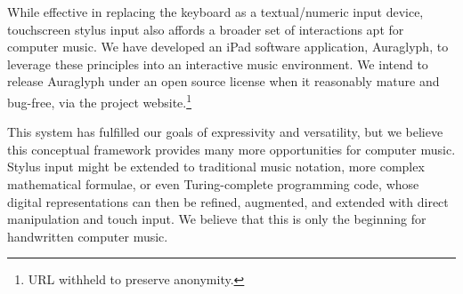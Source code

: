 \documentclass{nime-alternate}
\begin{document}
While effective in replacing the keyboard as a textual/numeric input device, touchscreen stylus input also affords a broader set of interactions apt for computer music. 
We have developed an iPad software application, Auraglyph, to leverage these principles into an interactive music environment. 
We intend to release Auraglyph under an open source license when it reasonably mature and bug-free, via the project website.\footnote{URL withheld to preserve anonymity.}

This system has fulfilled our goals of expressivity and versatility, but we believe this conceptual framework provides many more opportunities for computer music. 
Stylus input might be extended to traditional music notation, more complex mathematical formulae, or even Turing-complete programming code, whose digital representations can then be refined, augmented, and extended with direct manipulation and touch input. 
We believe that this is only the beginning for handwritten computer music. 


%

%
%


\end{document}
